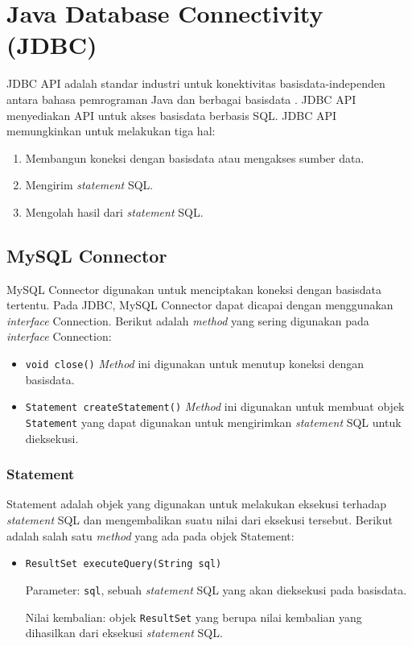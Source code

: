 \section{Java Database Connectivity (JDBC)}
\label{sec:jdbc}
JDBC API adalah standar industri untuk konektivitas basisdata-independen antara bahasa pemrograman Java dan berbagai basisdata \cite{jdbc}. JDBC API menyediakan API untuk akses basisdata berbasis SQL. JDBC API memungkinkan untuk melakukan tiga hal: 
\begin{enumerate}
	\item Membangun koneksi dengan basisdata atau mengakses sumber data.
	\item Mengirim \textit{statement} SQL.
	\item Mengolah hasil dari \textit{statement} SQL.
\end{enumerate}

\subsection{MySQL Connector}
MySQL Connector digunakan untuk menciptakan koneksi dengan basisdata tertentu. Pada JDBC, MySQL Connector dapat dicapai dengan menggunakan \textit{interface} Connection. Berikut adalah \textit{method} yang sering digunakan pada \textit{interface} Connection:
\begin{itemize}
	\item \texttt{void close()}
	\textit{Method} ini digunakan untuk menutup koneksi dengan basisdata.
	
	\item \texttt{Statement createStatement()}
	\textit{Method} ini digunakan untuk membuat objek \texttt{Statement} yang dapat digunakan untuk mengirimkan \textit{statement} SQL untuk dieksekusi.
\end{itemize}

\subsubsection{Statement}
Statement adalah objek yang digunakan untuk melakukan eksekusi terhadap \textit{statement} SQL dan mengembalikan suatu nilai dari eksekusi tersebut. Berikut adalah salah satu \textit{method} yang ada pada objek Statement:
\begin{itemize}
	\item \texttt{ResultSet executeQuery(String sql)}
	
	Parameter: \texttt{sql}, sebuah \textit{statement} SQL yang akan dieksekusi pada basisdata.
	
	Nilai kembalian: objek \texttt{ResultSet} yang berupa nilai kembalian yang dihasilkan dari eksekusi \textit{statement} SQL.
\end{itemize}

